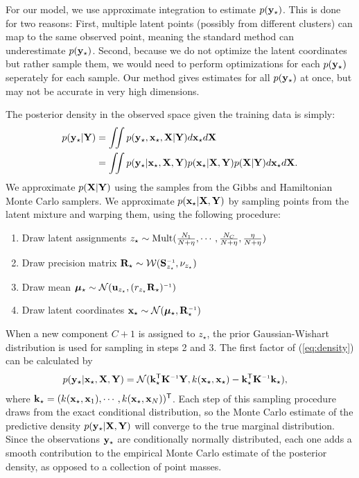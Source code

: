 For our model, we use approximate integration to estimate $p({\bf{y}}_\star)$.
This is done for two reasons:
First, multiple latent points (possibly from different clusters) can map to the same observed point, meaning the standard method can underestimate $p({\bf{y}}_\star)$.
Second, because we do not optimize the latent coordinates but rather sample them, we would need to perform optimizations for each $p({\bf{y}}_\star)$ seperately for each sample.
Our method gives estimates for all $p({\bf{y}}_\star)$ at once, but may not be accurate in very high dimensions.

The posterior density in the observed space given the training data is simply:
\begin{align}
p({\bf{y}}_\star | \mathbf{Y})
& = \int \!\!\! \int p({\bf{y}}_\star,{\bf{x}}_\star, \mathbf{X} | \mathbf{Y})d{\bf{x}}_\star d\mathbf{X} \nonumber\\
& = \int\!\!\! \int p({\bf{y}}_\star | {\bf{x}}_\star, \mathbf{X}, \mathbf{Y})p({\bf{x}}_\star|\mathbf{X},\mathbf{Y})p(\mathbf{X}|\mathbf{Y})d{\bf{x}}_\star d\mathbf{X}.
\label{eq:density}
\end{align}
We approximate $p(\mathbf{X} | \mathbf{Y})$ using the samples from the Gibbs and Hamiltonian Monte Carlo samplers.
We approximate $p({\bf{x}}_\star | \mathbf{X}, \mathbf{Y})$ by sampling points from the latent mixture and warping them, using the following procedure:
\begin{enumerate}
\item Draw latent assignments
$z_\star \sim {\rm Mult}(\frac{N_{1}}{N+\eta},\cdots,\frac{N_{C}}{N+\eta},\frac{\eta}{N+\eta})$
\item Draw precision matrix
$\vR_\star \sim {\cal W}(\vS\inv_{z_\star},\nu_{z_\star})$
\item Draw mean
$\vmu_\star \sim {\cal N}(\vu_{z_\star},(r_{z_\star}\vR_\star)\inv)$
\item Draw latent coordinates
$\vx_\star \sim {\cal N}(\vmu_\star,\vR_\star\inv)$
\end{enumerate}
%
When a new component $C+1$ is assigned to $z_\star$, the prior Gaussian-Wishart distribution is used for sampling in steps 2 and 3.
The first factor of (\ref{eq:density}) can be calculated by
%
\begin{align}
p(\vy_\star | \vx_\star, \vX, \vY)
& = {\cal N}(\vk_\star\tra \vK\inv \vY, k(\vx_\star,\vx_\star)-\vk_\star\tra \vK\inv \vk_\star),
\end{align}
%
where
%
${\bf{k}}_\star=( k({\bf{x}}_\star, {\bf{x}}_1), \cdots, k({\bf{x}}_\star, {\bf{x}}_N))^{\mathsf{T}}$.
%  
Each step of this sampling procedure draws from the exact conditional distribution, so the Monte Carlo estimate of the predictive density $p({\bf{y}}_\star | \mathbf{X}, \mathbf{Y})$ will converge to the true marginal distribution.
Since the observations ${\bf{y}}_\star$ are conditionally normally distributed, each one adds a smooth contribution to the empirical Monte Carlo estimate of the posterior density, as opposed to a collection of point masses.


